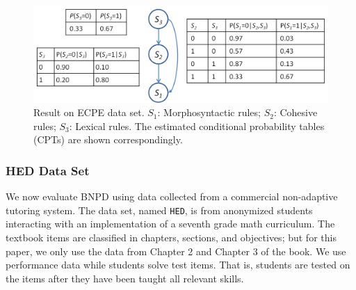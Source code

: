 \documentclass{edm_template}
\begin{document}
{			\begin{figure}[!th]
				\begin{center}
					\centering
					\includegraphics[width=1.0\linewidth]{figures/ecpe_results.png}
				\end{center}
				\caption{Result on ECPE data set. $S_1$: Morphosyntactic rules; $S_2$: Cohesive rules; $S_3$: Lexical rules. 
					The estimated conditional probability tables (CPTs) are shown correspondingly.}
				\label{fig:ecpe-result} 
			\end{figure}
	
	\subsubsection{HED Data Set}
	We now evaluate BNPD using data collected from a commercial non-adaptive tutoring system.
	The data set, named \texttt{HED}, is from anonymized students interacting with an implementation of a seventh grade math curriculum.
	The textbook items are classified in chapters, sections, and objectives; but for this paper, we only use the data from Chapter 2 and Chapter 3 of the book.
	We use performance data while students solve test items. That is, students are tested on the items after they have been taught all relevant skills.
	
	
}
\end{document}
